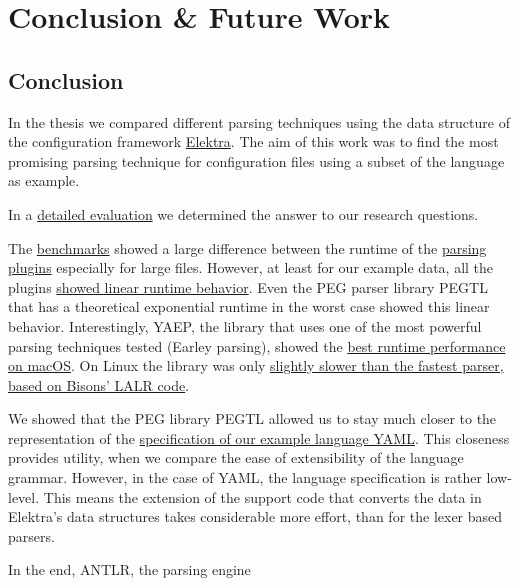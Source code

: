 \chapter{Conclusion \& Future Work}
\label{sec:conclusion_and_future_work}

\section{Conclusion}

In the thesis we compared different parsing techniques using the  data structure of the configuration framework \href{https://www.libelektra.org}{Elektra}. The aim of this work was to find the most promising parsing technique for configuration files using a subset of the language  as example.

In a \hyperref[sec:evaluation]{detailed evaluation} we determined the answer to our research questions.

\speed*

The \hyperref[sec:run_time_performance]{benchmarks} showed a large difference between the runtime of the \hyperref[sec:design_challenges_and_decisions]{parsing plugins} especially for large files. However, at least for our example data, all the plugins \hyperref[fig:benchmark_results_generated_above_1000]{showed linear runtime behavior}. Even the PEG parser library \gls{PEGTL} that has a theoretical exponential runtime in the worst case showed this linear behavior. Interestingly, \gls{YAEP}, the library that uses one of the most powerful parsing techniques tested (Earley parsing), showed the \hyperref[fig:benchmark_generated]{best runtime performance on macOS}. On Linux the library was only \hyperref[fig:benchmark_generated]{slightly slower than the fastest parser, based on Bisons’ LALR code}.

\closeness*

We showed that the \gls{PEG} library \gls{PEGTL} allowed us to stay much closer to the representation of the \href{http://yaml.org/spec/1.2/spec.html}{specification of our example language YAML}. This closeness provides utility, when we compare the ease of extensibility of the language grammar. However, in the case of YAML, the language specification is rather low-level. This means the extension of the support code that converts the data in Elektra’s data structures takes considerable more effort, than for the lexer based parsers.

In the end, \gls{ANTLR}, the parsing engine

